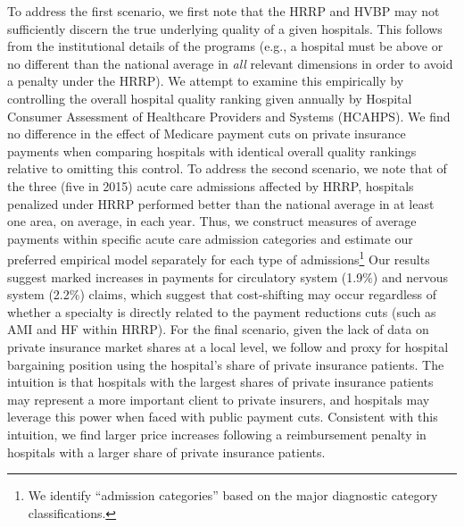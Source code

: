 \documentclass[12pt]{article}
\begin{document}
To address the first scenario, we first note that the HRRP and HVBP may not sufficiently discern the true underlying quality of a given hospitals. This follows from the institutional details of the programs (e.g., a hospital must be above or no different than the national average in \textit{all} relevant dimensions in order to avoid a penalty under the HRRP). We attempt to examine this empirically by controlling the overall hospital quality ranking given annually by Hospital Consumer Assessment of Healthcare Providers and Systems (HCAHPS). We find no difference in the effect of Medicare payment cuts on private insurance payments when comparing hospitals with identical overall quality rankings relative to omitting this control.  To address the second scenario, we note that of the three (five in 2015) acute care admissions affected by HRRP, hospitals penalized under HRRP performed better than the national average in at least one area, on average, in each year.  Thus, we construct measures of average payments within specific acute care admission categories and estimate our preferred empirical model separately for each type of admissions\footnote{We identify ``admission categories'' based on the major diagnostic category classifications.}   Our results suggest marked increases in payments for circulatory system (1.9$\%$) and nervous system (2.2$\%$) claims, which suggest that cost-shifting may occur regardless of whether a specialty is directly related to the payment reductions cuts (such as AMI and HF within HRRP).  For the final scenario, given the lack of data on private insurance market shares at a local level, we follow \cite{wu2010} and proxy for hospital bargaining position using the hospital's share of private insurance patients. The intuition is that hospitals with the largest shares of private insurance patients may represent a more important client to private insurers, and hospitals may leverage this power when faced with public payment cuts. Consistent with this intuition, we find larger price increases following a reimbursement penalty in hospitals with a larger share of private insurance patients.
\end{document}
